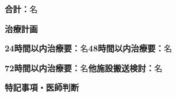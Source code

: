 \documentclass[a4paper,12pt]{jarticle}
\newcommand{\underlinespace}[1]{\underline{\hspace{#1}}}
\begin{document}
\vspace{2mm}

\noindent
\textbf{合計：}\underlinespace{2cm}名

\vspace{8mm}

\begin{center}
\textbf{\large 治療計画}
\end{center}

\vspace{3mm}

\noindent
\textbf{24時間以内治療要：}\underlinespace{2cm}名\quad \textbf{48時間以内治療要：}\underlinespace{2cm}名

\vspace{2mm}

\noindent
\textbf{72時間以内治療要：}\underlinespace{2cm}名\quad \textbf{他施設搬送検討：}\underlinespace{2cm}名

\vspace{8mm}

\begin{center}
\textbf{\large 特記事項・医師判断}
\end{center}

\vspace{3mm}

\noindent
\underlinespace{13cm}

\vspace{3mm}

\noindent
\underlinespace{13cm}

\vspace{3mm}

\noindent
\underlinespace{13cm}

\vspace{3mm}

\noindent
\underlinespace{13cm}

\vspace{3mm}

\noindent
\underlinespace{13cm}
\end{document}
